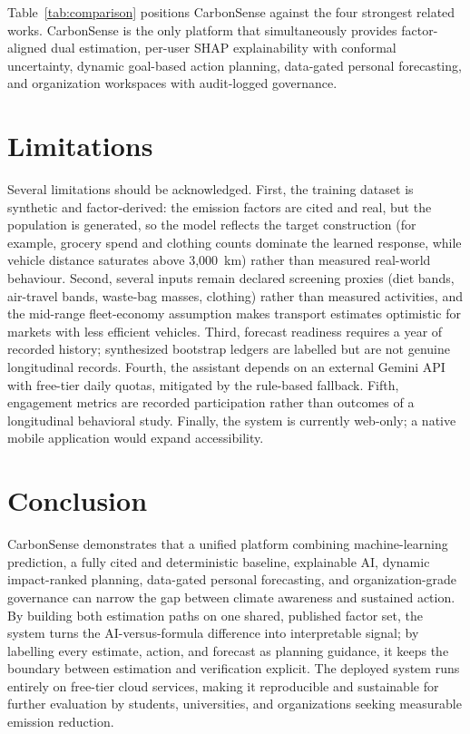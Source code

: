 \documentclass[conference]{IEEEtran}
\begin{document}
Table~\ref{tab:comparison} positions CarbonSense against the four strongest related works. CarbonSense is the only platform that simultaneously provides factor-aligned dual estimation, per-user SHAP explainability with conformal uncertainty, dynamic goal-based action planning, data-gated personal forecasting, and organization workspaces with audit-logged governance.

\FloatBarrier

\section{Limitations}

Several limitations should be acknowledged. First, the training dataset is synthetic and factor-derived: the emission factors are cited and real, but the population is generated, so the model reflects the target construction (for example, grocery spend and clothing counts dominate the learned response, while vehicle distance saturates above 3,000~km) rather than measured real-world behaviour. Second, several inputs remain declared screening proxies (diet bands, air-travel bands, waste-bag masses, clothing) rather than measured activities, and the mid-range fleet-economy assumption makes transport estimates optimistic for markets with less efficient vehicles. Third, forecast readiness requires a year of recorded history; synthesized bootstrap ledgers are labelled but are not genuine longitudinal records. Fourth, the assistant depends on an external Gemini API with free-tier daily quotas, mitigated by the rule-based fallback. Fifth, engagement metrics are recorded participation rather than outcomes of a longitudinal behavioral study. Finally, the system is currently web-only; a native mobile application would expand accessibility.

\section{Conclusion}

CarbonSense demonstrates that a unified platform combining machine-learning prediction, a fully cited and deterministic baseline, explainable AI, dynamic impact-ranked planning, data-gated personal forecasting, and organization-grade governance can narrow the gap between climate awareness and sustained action. By building both estimation paths on one shared, published factor set, the system turns the AI-versus-formula difference into interpretable signal; by labelling every estimate, action, and forecast as planning guidance, it keeps the boundary between estimation and verification explicit. The deployed system runs entirely on free-tier cloud services, making it reproducible and sustainable for further evaluation by students, universities, and organizations seeking measurable emission reduction.
\end{document}
